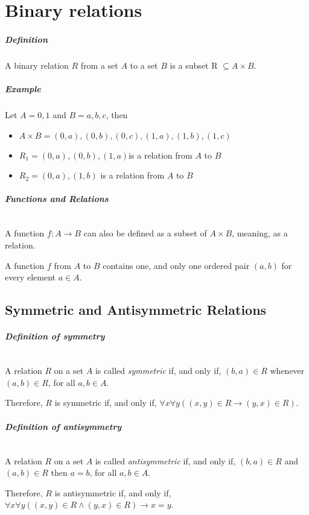 \documentclass[10pt,a4paper]{book}
\begin{document}
\chapter{Binary relations}

\paragraph*{Definition}
A binary relation $R$ from a set $A$ to a set $B$ is a subset R $\subseteq A \times B$.

\paragraph*{Example}
Let $A = {0,1}$ and $B = {a,b,c}$, then
\begin{itemize}
\item $A \times B ={(0, a),(0, b),(0, c),(1, a), (1, b), (1, c)}$
\item $R_1 ={(0, a), (0, b), (1, a)}$is a relation from $A$ to $B$
\item $R_2 ={(0, a), (1,b)}$ is a relation from $A$ to $B$
\end{itemize}

\paragraph*{Functions and Relations}
$\ $\par 
A function $f:A \to B$ can also be defined as a subset of $A \times B$, meaning, as a relation.\par
A function $f$ from $A$ to $B$ contains one, and only one ordered pair $(a,b)$ for every element $a \in A$.

\section{Symmetric and Antisymmetric Relations}

\paragraph*{Definition of symmetry}
$\ $\par 
A relation $R$ on a set $A$ is called \textit{symmetric} if, and only if, $(b,a) \in R$ whenever $(a,b) \in R$, for all $a,b \in A$.\par
Therefore, $R$ is symmetric if, and only if, $\forall x \forall y ((x,y) \in R \to (y,x) \in R)$.

\paragraph*{Definition of antisymmetry}
$\ $\par
A relation $R$ on a set $A$ is called \textit{antisymmetric} if, and only if, $(b,a) \in R$ and $(a,b) \in R$ then $a = b$, for all $a,b \in A$.\par
Therefore, $R$ is antisymmetric if, and only if, $\forall x \forall y ((x,y) \in R \land (y,x) \in R) \to x = y$.
\end{document}
